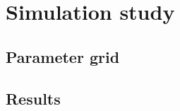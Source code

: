 \chapter{Simulation study}
\label{cap:model}

\section{Parameter grid}
\label{sec:prior}

\section{Results}
\label{sec:simu}